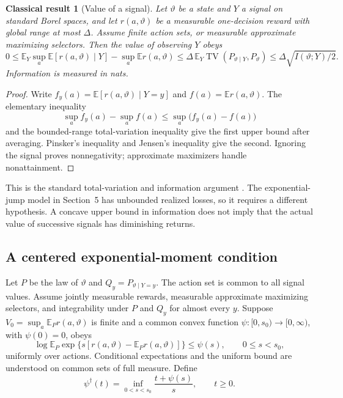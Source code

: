 \documentclass[11pt]{article}
\theoremstyle{plain}
\newtheorem{classical}[theorem]{Classical result}
\theoremstyle{definition}
\theoremstyle{remark}
\newcommand{\E}{\mathbb E}
\DeclareMathOperator{\TV}{TV}
\begin{document}
\begin{classical}[Value of a signal]\label{thm:information}
Let \(\vartheta\) be a state and \(Y\) a signal on standard Borel spaces,
and let \(r(a,\vartheta)\) be a
measurable one-decision reward with global range at most \(\Delta\).
Assume finite action sets, or measurable approximate maximizing
selectors. Then the value of observing \(Y\) obeys
\[
0\le
\E_Y\sup_a\E[r(a,\vartheta)\mid Y]
 -\sup_a\E r(a,\vartheta)
\le\Delta\,\E_Y\TV(P_{\vartheta\mid Y},P_\vartheta)
\le\Delta\sqrt{I(\vartheta;Y)/2}.
\]
Information is measured in nats.
\end{classical}
\begin{proof}
Write \(f_y(a)=\E[r(a,\vartheta)\mid Y=y]\) and
\(f(a)=\E r(a,\vartheta)\). The elementary inequality
\[
\sup_a f_y(a)-\sup_a f(a)\le\sup_a\big(f_y(a)-f(a)\big)
\]
and the bounded-range total-variation inequality give the first upper
bound after averaging. Pinsker's inequality and Jensen's inequality
give the second. Ignoring the signal proves nonnegativity; approximate
maximizers handle nonattainment.
\end{proof}

This is the standard total-variation and information argument
\citep{CoverThomas2006}. The exponential-jump model in Section~5 has
unbounded realized losses, so it requires a different hypothesis.
A concave upper bound in information does not imply that the actual
value of successive signals has diminishing returns.

\subsection{A centered exponential-moment condition}

Let \(P\) be the law of \(\vartheta\) and \(Q_y=P_{\vartheta\mid Y=y}\).
The action set is common to all signal values. Assume jointly measurable
rewards, measurable approximate maximizing selectors, and integrability
under \(P\) and \(Q_y\) for almost every \(y\). Suppose
\(V_0=\sup_a\E_P r(a,\vartheta)\) is finite and a common convex
function \(\psi:[0,s_0)\to[0,\infty)\), with \(\psi(0)=0\), obeys
\begin{equation}\label{eq:centeredmgf}
\log\E_P\exp\{s[r(a,\vartheta)-\E_P r(a,\vartheta)]\}
\le\psi(s),\qquad 0\le s<s_0,
\end{equation}
uniformly over actions. Conditional expectations and the uniform bound
are understood on common sets of full measure. Define
\[
\psi^\dagger(t)=\inf_{0<s<s_0}\frac{t+\psi(s)}s,\qquad t\ge0.
\]
\end{document}
